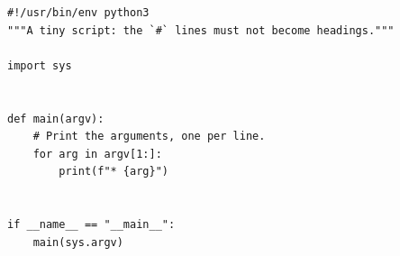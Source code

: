 \documentclass[11pt,a4paper]{article}
\begin{document}
\begin{verbatim}
#!/usr/bin/env python3
"""A tiny script: the `#` lines must not become headings."""

import sys


def main(argv):
    # Print the arguments, one per line.
    for arg in argv[1:]:
        print(f"* {arg}")


if __name__ == "__main__":
    main(sys.argv)
\end{verbatim}
\end{document}

